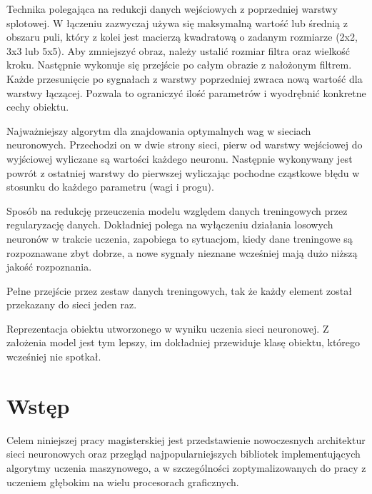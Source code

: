 \documentclass[12pt,a4paper,twoside,titlepage,openright]{book}
\begin{document}
\begin{description}[style=nextline]
	\item[Łączenie (ang. \textit{pooling})] Technika polegająca na redukcji danych wejściowych z poprzedniej warstwy splotowej. W łączeniu zazwyczaj używa się maksymalną wartość lub średnią z obszaru puli, który z kolei jest macierzą kwadratową o zadanym rozmiarze (2x2, 3x3 lub 5x5). Aby zmniejszyć obraz, należy ustalić rozmiar filtra oraz wielkość kroku. Następnie wykonuje się przejście po całym obrazie z nałożonym filtrem. Każde przesunięcie po sygnałach z warstwy poprzedniej zwraca nową wartość dla warstwy łączącej. Pozwala to ograniczyć ilość parametrów i wyodrębnić konkretne cechy obiektu.
	\item[Wsteczna propagacja błędu] Najważniejszy algorytm dla znajdowania optymalnych wag w sieciach neuronowych. Przechodzi on w dwie strony sieci, pierw od warstwy wejściowej do wyjściowej wyliczane są wartości każdego neuronu. Następnie wykonywany jest powrót z ostatniej warstwy do pierwszej wyliczając pochodne cząstkowe błędu w stosunku do każdego parametru (wagi i progu).
	\item[Wyrzucanie połączeń (ang. \textit{dropout})] Sposób na redukcję przeuczenia modelu względem danych treningowych przez regularyzację danych. Dokładniej polega na wyłączeniu działania losowych neuronów w trakcie uczenia, zapobiega to sytuacjom, kiedy dane treningowe są rozpoznawane zbyt dobrze, a nowe sygnały nieznane wcześniej mają dużo niższą jakość rozpoznania.
	\item[Epoka] Pełne przejście przez zestaw danych treningowych, tak że każdy element został przekazany do sieci jeden raz.
	\item[Model] Reprezentacja obiektu utworzonego w wyniku uczenia sieci neuronowej. Z założenia model jest tym lepszy, im dokładniej przewiduje klasę obiektu, którego wcześniej nie spotkał.
\end{description}
 

\chapter*{Wstęp}
Celem niniejszej pracy magisterskiej jest przedstawienie nowoczesnych architektur sieci neuronowych oraz przegląd najpopularniejszych bibliotek implementujących algorytmy uczenia maszynowego, a w szczególności zoptymalizowanych do pracy z uczeniem głębokim na wielu procesorach graficznych. 
\end{document}
